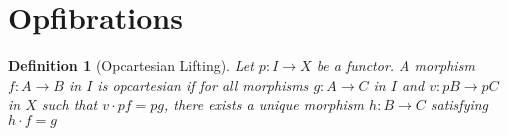 \documentclass[a4paper,10pt]{article}
\newtheorem{definition}{Definition}
\begin{document}
% 
% 
% 
% 


\section{Opfibrations}

\begin{definition}[Opcartesian Lifting] \label{opcartesian}
  Let $p : I \to X$ be a functor. A morphism $f : A \to B$ in $I$ is opcartesian if for all morphisms $g : A \to C$ in $I$ and $v : pB \to pC$ in $X$ such that $v \cdot pf = pg$, there exists a unique morphism $h : B \to C$ satisfying $h \cdot f = g$
\end{definition}
\end{document}

